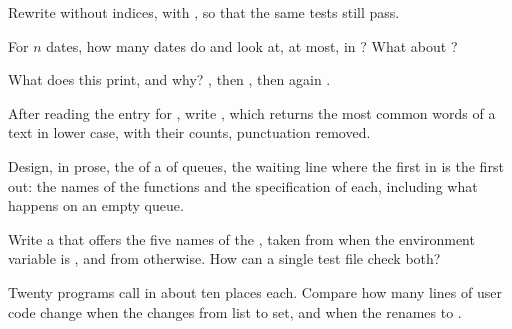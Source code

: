 \begin{exercise}[$\star\star$]\label{exo:g11:modules-and-interfaces:8}
Rewrite  without indices, with , so that the same tests still pass.
\end{exercise}

\begin{exercise}[$\star\star$]\label{exo:g11:modules-and-interfaces:9}
For $n$ dates, how many dates do  and  look at, at most, in ? What about
?
\end{exercise}

\begin{exercise}[$\star\star$]\label{exo:g11:modules-and-interfaces:10}
What does this print, and why? , then , then again
.
\end{exercise}

\begin{exercise}[$\star\star$]\label{exo:g11:modules-and-interfaces:11}
After reading the entry for , write , which returns the  most common
words of a text in lower case, with their counts, punctuation removed.
\end{exercise}

\begin{exercise}[$\star\star\star$]\label{exo:g11:modules-and-interfaces:12}
Design, in prose, the  of a  of queues, the waiting line where the first in is the first out: the names
of the functions and the specification of each, including what happens on an empty queue.
\end{exercise}

\begin{exercise}[$\star\star\star$]\label{exo:g11:modules-and-interfaces:13}
Write a   that offers the five names of the , taken from  when the
environment variable  is , and from  otherwise. How can a single test file
check both?
\end{exercise}

\begin{exercise}[$\star\star\star$]\label{exo:g11:modules-and-interfaces:14}
Twenty programs call  in about ten places each. Compare how many lines of user code change when the
 changes from list to set, and when the  renames  to .
\end{exercise}

